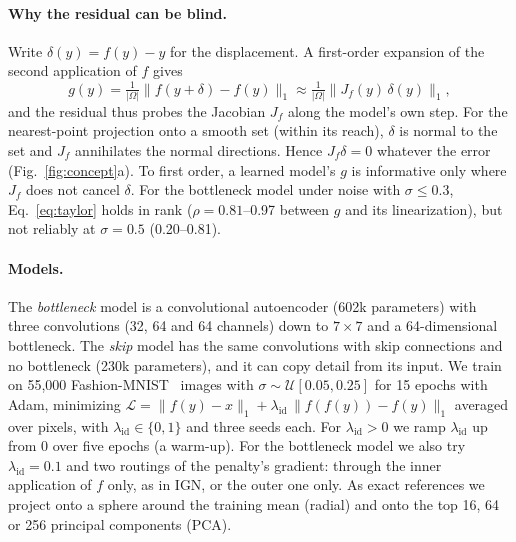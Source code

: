 \documentclass[10pt,twocolumn,a4paper]{article}
\newcommand{\norm}[1]{\lVert #1 \rVert}
\newcommand{\lid}{\lambda_{\mathrm{id}}}
\begin{document}
\paragraph{Why the residual can be blind.}
Write $\delta(y) = f(y) - y$ for the displacement. A first-order expansion of the second
application of $f$ gives
\begin{equation}
  g(y) = \tfrac{1}{|\Omega|}\norm{f(y + \delta) - f(y)}_1
       \approx \tfrac{1}{|\Omega|}\norm{J_f(y)\,\delta(y)}_1,
  \label{eq:taylor}
\end{equation}
and the residual thus probes the Jacobian $J_f$ along the model's own step. For the nearest-point
projection onto a smooth set (within its reach), $\delta$ is normal to the set and $J_f$
annihilates the normal directions. Hence $J_f\delta = 0$ whatever the error
(Fig.~\ref{fig:concept}a). To first order, a learned model's $g$ is informative only where $J_f$
does not cancel $\delta$. For the bottleneck model under noise with $\sigma \le 0.3$, Eq.~\eqref{eq:taylor}
holds in rank ($\rho = 0.81$--0.97 between $g$ and its linearization), but not reliably at
$\sigma = 0.5$ (0.20--0.81).

\paragraph{Models.}
The \emph{bottleneck} model is a convolutional autoencoder (602k parameters) with three
convolutions (32, 64 and 64 channels) down to $7\times7$ and a 64-dimensional bottleneck. The
\emph{skip} model has the same convolutions with skip connections and no bottleneck (230k
parameters), and it can copy detail from its input. We train on 55{,}000
Fashion-MNIST~\cite{xiao2017fashion} images with $\sigma \sim \mathcal{U}[0.05, 0.25]$ for 15
epochs with Adam, minimizing $\mathcal{L} = \norm{f(y) - x}_1 + \lid\,\norm{f(f(y)) - f(y)}_1$
averaged over pixels, with $\lid \in \{0, 1\}$ and three seeds each. For $\lid > 0$ we ramp $\lid$
up from 0 over five epochs (a warm-up). For the bottleneck model we also try $\lid = 0.1$ and two
routings of the penalty's gradient: through the inner application of $f$ only, as in IGN, or the
outer one only. As exact references we project onto a sphere around the training mean
(radial) and onto the top 16, 64 or 256 principal components (PCA).
\end{document}
